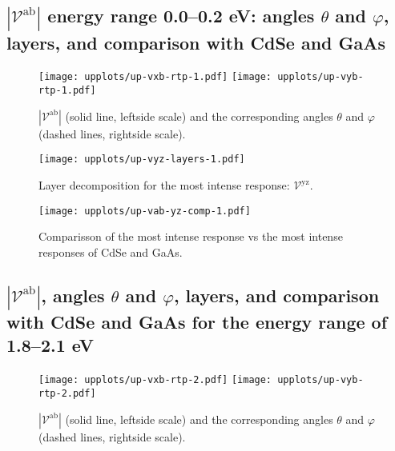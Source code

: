 \documentclass{article}
\let\Oldsubsection\subsection
\renewcommand{\subsection}{\FloatBarrier\Oldsubsection}
\begin{document}
\clearpage

\subsection{$|\mathcal{V}^{\mathrm{ab}}|$ energy range 0.0--0.2 eV: angles
$\theta$ and $\varphi$, layers, and comparison with CdSe and GaAs}

\begin{figure}[ht]
    \centering
    \texttt{[image: upplots/up-vxb-rtp-1.pdf]}
    \texttt{[image: upplots/up-vyb-rtp-1.pdf]}
    \caption{$|\mathcal{V}^{\mathrm{ab}}|$ (solid line, leftside scale) and the
    corresponding angles $\theta$ and $\varphi$ (dashed lines, rightside scale).}
    \label{fig:up-rtp1}
\end{figure}

\begin{figure}[ht]
    \centering
    \texttt{[image: upplots/up-vyz-layers-1.pdf]}
    \caption{Layer decomposition for the most intense response:
    $\mathcal{V}^{\mathrm{yz}}$.}
    \label{fig:up-lay1}
\end{figure}

\begin{figure}[ht]
    \centering
    \texttt{[image: upplots/up-vab-yz-comp-1.pdf]}
    \caption{Comparisson of the most intense response vs the most intense
    responses of CdSe and GaAs.}
    \label{fig:up-comp1}
\end{figure}

\subsection{$|\mathcal{V}^{\mathrm{ab}}|$, angles
$\theta$ and $\varphi$, layers, and comparison with CdSe and GaAs for the energy
range of 1.8--2.1 eV}

\begin{figure}[ht]
    \centering
    \texttt{[image: upplots/up-vxb-rtp-2.pdf]}
    \texttt{[image: upplots/up-vyb-rtp-2.pdf]}
    \caption{$|\mathcal{V}^{\mathrm{ab}}|$ (solid line, leftside scale) and the
    corresponding angles $\theta$ and $\varphi$ (dashed lines, rightside scale).}
    \label{fig:up-rtp2}
\end{figure}
\end{document}

